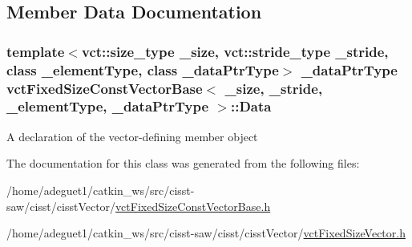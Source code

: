 \subsection{Member Data Documentation}
\hypertarget{classvct_fixed_size_const_vector_base_ad5bab7d48e82872547b8838ef74980ee}{
\subsubsection[{Data}]{\setlength{\rightskip}{0pt plus 5cm}template$<$vct\-::size\-\_\-type \-\_\-size, vct\-::stride\-\_\-type \-\_\-stride, class \-\_\-element\-Type, class \-\_\-data\-Ptr\-Type$>$ \-\_\-data\-Ptr\-Type {\bf vct\-Fixed\-Size\-Const\-Vector\-Base}$<$ \-\_\-size, \-\_\-stride, \-\_\-element\-Type, \-\_\-data\-Ptr\-Type $>$\-::Data\hspace{0.3cm}{\ttfamily [protected]}}}\label{classvct_fixed_size_const_vector_base_ad5bab7d48e82872547b8838ef74980ee}
A declaration of the vector-\/defining member object 

The documentation for this class was generated from the following files\-:\begin{DoxyCompactItemize}
\item 
/home/adeguet1/catkin\-\_\-ws/src/cisst-\/saw/cisst/cisst\-Vector/\hyperlink{vct_fixed_size_const_vector_base_8h}{vct\-Fixed\-Size\-Const\-Vector\-Base.\-h}\item 
/home/adeguet1/catkin\-\_\-ws/src/cisst-\/saw/cisst/cisst\-Vector/\hyperlink{vct_fixed_size_vector_8h}{vct\-Fixed\-Size\-Vector.\-h}\end{DoxyCompactItemize}

